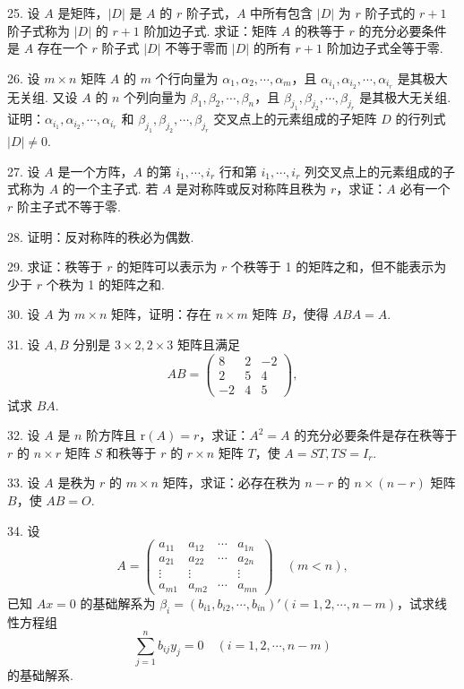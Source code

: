 \documentclass[UTF8,12pt,a4paper,fontset=fandol]{ctexart}
\begin{document}
25. 设 $A$ 是矩阵，$|D|$ 是 $A$ 的 $r$ 阶子式，$A$ 中所有包含 $|D|$ 为 $r$ 阶子式的 $r+1$ 阶子式称为 $|D|$ 的 $r+1$ 阶加边子式. 求证：矩阵 $A$ 的秩等于 $r$ 的充分必要条件是 $A$ 存在一个 $r$ 阶子式 $|D|$ 不等于零而 $|D|$ 的所有 $r+1$ 阶加边子式全等于零.

26. 设 $m\times n$ 矩阵 $A$ 的 $m$ 个行向量为 $\alpha_1,\alpha_2,\cdots,\alpha_m$，且 $\alpha_{i_1},\alpha_{i_2},\cdots,\alpha_{i_r}$ 是其极大无关组. 又设 $A$ 的 $n$ 个列向量为 $\beta_1,\beta_2,\cdots,\beta_n$，且 $\beta_{j_1},\beta_{j_2},\cdots,\beta_{j_r}$ 是其极大无关组. 证明：$\alpha_{i_1},\alpha_{i_2},\cdots,\alpha_{i_r}$ 和 $\beta_{j_1},\beta_{j_2},\cdots,\beta_{j_r}$ 交叉点上的元素组成的子矩阵 $D$ 的行列式 $|D|\neq 0$.

27. 设 $A$ 是一个方阵，$A$ 的第 $i_1,\cdots,i_r$ 行和第 $i_1,\cdots,i_r$ 列交叉点上的元素组成的子式称为 $A$ 的一个主子式. 若 $A$ 是对称阵或反对称阵且秩为 $r$，求证：$A$ 必有一个 $r$ 阶主子式不等于零.

28. 证明：反对称阵的秩必为偶数.

29. 求证：秩等于 $r$ 的矩阵可以表示为 $r$ 个秩等于 1 的矩阵之和，但不能表示为少于 $r$ 个秩为 1 的矩阵之和.

30. 设 $A$ 为 $m\times n$ 矩阵，证明：存在 $n\times m$ 矩阵 $B$，使得 $ABA=A$.

31. 设 $A,B$ 分别是 $3\times 2,2\times 3$ 矩阵且满足
\[
AB=\left(\begin{array}{rrr}
8&2&-2\\
2&5&4\\
-2&4&5
\end{array}\right),
\]
试求 $BA$.

32. 设 $A$ 是 $n$ 阶方阵且 $\mathrm{r}(A)=r$，求证：$A^2=A$ 的充分必要条件是存在秩等于 $r$ 的 $n\times r$ 矩阵 $S$ 和秩等于 $r$ 的 $r\times n$ 矩阵 $T$，使 $A=ST,TS=I_r$.

33. 设 $A$ 是秩为 $r$ 的 $m\times n$ 矩阵，求证：必存在秩为 $n-r$ 的 $n\times(n-r)$ 矩阵 $B$，使 $AB=O$.

34. 设
\[
A=\left(\begin{array}{cccc}
a_{11}&a_{12}&\cdots&a_{1n}\\
a_{21}&a_{22}&\cdots&a_{2n}\\
\vdots&\vdots&&\vdots\\
a_{m1}&a_{m2}&\cdots&a_{mn}
\end{array}\right)\quad (m<n),
\]
已知 $Ax=0$ 的基础解系为 $\beta_i=(b_{i1},b_{i2},\cdots,b_{in})'(i=1,2,\cdots,n-m)$，试求线性方程组
\[
\sum_{j=1}^n b_{ij}y_j=0\quad (i=1,2,\cdots,n-m)
\]
的基础解系.
\end{document}
